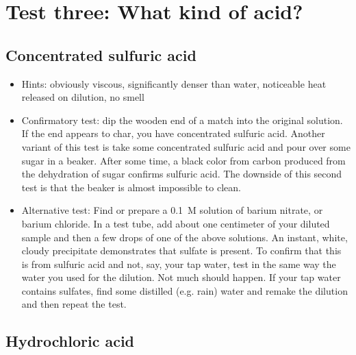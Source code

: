 \section{Test three: What kind of acid?}

\subsection{Concentrated sulfuric acid}

\begin{itemize}

\item{Hints: obviously viscous, 
significantly denser than water, 
noticeable heat released on dilution, 
no smell}

\item{Confirmatory test: dip the wooden end of a match into the original solution. 
If the end appears to char, 
you have concentrated sulfuric acid. 
Another variant of this test is take some concentrated sulfuric acid 
and pour over some sugar in a beaker. 
After some time, 
a black color from carbon produced 
from the dehydration of sugar confirms sulfuric acid. 
The downside of this second test is that the beaker 
is almost impossible to clean.}

\item{Alternative test: Find or prepare a 0.1~M solution of 
barium nitrate, 
or barium chloride. 
In a test tube, 
add about one centimeter of your diluted sample 
and then a few drops of one of the above solutions. 
An instant, 
white, 
cloudy precipitate demonstrates that sulfate is present. 
To confirm that this is from sulfuric acid and not, 
say, 
your tap water, 
test in the same way the water you used for the dilution. 
Not much should happen. 
If your tap water contains sulfates, 
find some distilled (e.g. 
rain) water and remake the dilution 
and then repeat the test.}
\end{itemize}

\subsection{Hydrochloric acid}

